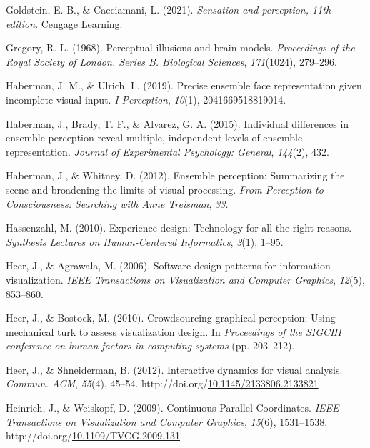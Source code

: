 \documentclass[print]{nuthesis}
\newlength{\cslhangindent}
\newenvironment{CSLReferences}[2]%
{\setlength{\parindent}{0pt}%
\everypar{\setlength{\hangindent}{\cslhangindent}}\ignorespaces}%
{\par}
\begin{document}
\begin{CSLReferences}{1}{0}
\leavevmode{}%
Goldstein, E. B., \& Cacciamani, L. (2021). \emph{Sensation and perception, 11th edition}. Cengage Learning.

\leavevmode{}%
Gregory, R. L. (1968). Perceptual illusions and brain models. \emph{Proceedings of the Royal Society of London. Series B. Biological Sciences}, \emph{171}(1024), 279--296.

\leavevmode{}%
Haberman, J. M., \& Ulrich, L. (2019). Precise ensemble face representation given incomplete visual input. \emph{I-Perception}, \emph{10}(1), 2041669518819014.

\leavevmode{}%
Haberman, J., Brady, T. F., \& Alvarez, G. A. (2015). Individual differences in ensemble perception reveal multiple, independent levels of ensemble representation. \emph{Journal of Experimental Psychology: General}, \emph{144}(2), 432.

\leavevmode{}%
Haberman, J., \& Whitney, D. (2012). Ensemble perception: Summarizing the scene and broadening the limits of visual processing. \emph{From Perception to Consciousness: Searching with Anne Treisman}, \emph{33}.

\leavevmode{}%
Hassenzahl, M. (2010). Experience design: Technology for all the right reasons. \emph{Synthesis Lectures on Human-Centered Informatics}, \emph{3}(1), 1--95.

\leavevmode{}%
Heer, J., \& Agrawala, M. (2006). Software design patterns for information visualization. \emph{IEEE Transactions on Visualization and Computer Graphics}, \emph{12}(5), 853--860.

\leavevmode{}%
Heer, J., \& Bostock, M. (2010). Crowdsourcing graphical perception: Using mechanical turk to assess visualization design. In \emph{Proceedings of the SIGCHI conference on human factors in computing systems} (pp. 203--212).

\leavevmode{}%
Heer, J., \& Shneiderman, B. (2012). Interactive dynamics for visual analysis. \emph{Commun. ACM}, \emph{55}(4), 45--54. http://doi.org/\href{https://doi.org/10.1145/2133806.2133821}{10.1145/2133806.2133821}

\leavevmode{}%
Heinrich, J., \& Weiskopf, D. (2009). {Continuous Parallel Coordinates}. \emph{IEEE Transactions on Visualization and Computer Graphics}, \emph{15}(6), 1531--1538. http://doi.org/\href{https://doi.org/10.1109/TVCG.2009.131}{10.1109/TVCG.2009.131}


\end{CSLReferences}
\end{document}
